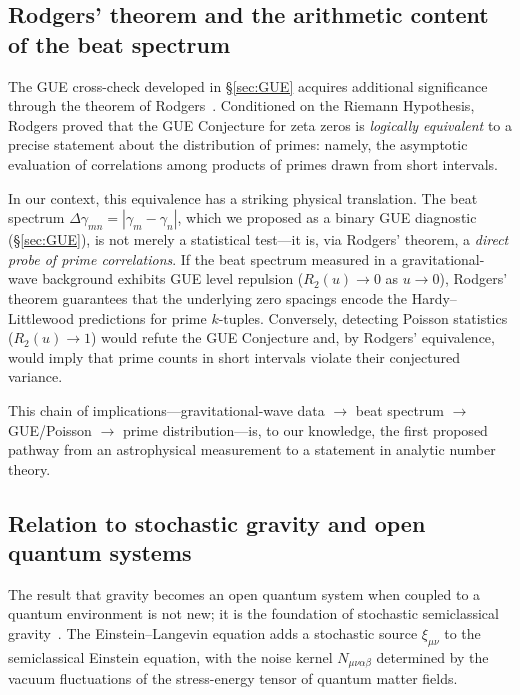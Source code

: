 \documentclass[12pt,a4paper]{article}
\begin{document}
\subsection{Rodgers' theorem and the arithmetic content of the
            beat spectrum}
\label{subsec:rodgers-arithmetic}

The GUE cross-check developed in \S\ref{sec:GUE} acquires
additional significance through the theorem of
Rodgers~\cite{Rodgers2018,Rodgers2024MMJ}.
Conditioned on the Riemann Hypothesis, Rodgers proved that the
GUE Conjecture for zeta zeros is \emph{logically equivalent} to
a precise statement about the distribution of primes: namely,
the asymptotic evaluation of correlations among products of
primes drawn from short intervals.

In our context, this equivalence has a striking physical
translation.
The beat spectrum $\Delta\gamma_{mn} = |\gamma_{m}-\gamma_{n}|$,
which we proposed as a binary GUE diagnostic
(\S\ref{sec:GUE}), is not merely a statistical test---it is,
via Rodgers' theorem, a \emph{direct probe of prime
correlations}.
If the beat spectrum measured in a gravitational-wave
background exhibits GUE level repulsion ($R_{2}(u) \to 0$ as
$u \to 0$), Rodgers' theorem guarantees that the underlying
zero spacings encode the Hardy--Littlewood predictions for
prime $k$-tuples.
Conversely, detecting Poisson statistics ($R_{2}(u) \to 1$)
would refute the GUE Conjecture and, by Rodgers' equivalence,
would imply that prime counts in short intervals violate
their conjectured variance.

This chain of implications---gravitational-wave data
$\to$ beat spectrum $\to$ GUE/Poisson $\to$ prime
distribution---is, to our knowledge, the first proposed
pathway from an astrophysical measurement to a statement
in analytic number theory.


\subsection{Relation to stochastic gravity and open quantum
            systems}
\label{subsec:stochastic-gravity-context}

The result that gravity becomes an open quantum system when
coupled to a quantum environment is not new; it is the
foundation of stochastic semiclassical
gravity~\cite{HuVerdaguer2004,HuVerdaguer2008,CalzettaHu2008}.
The Einstein--Langevin equation adds a stochastic source
$\xi_{\mu\nu}$ to the semiclassical Einstein equation, with
the noise kernel $N_{\mu\nu\alpha\beta}$ determined by the
vacuum fluctuations of the stress-energy tensor of quantum
matter fields.
\end{document}
